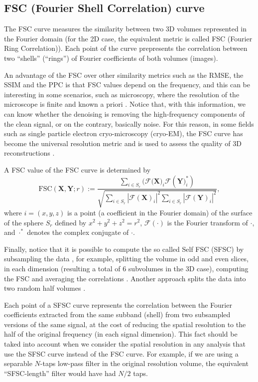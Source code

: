 \documentclass{article}
\begin{document}
\subsection{FSC (Fourier Shell Correlation) curve}
The FSC curve measures the similarity between two 3D volumes
represented in the Fourier domain \cite{verbeke2024self} (for the 2D
case, the equivalent metric is called FSC (Fourier Ring
Correlation)). Each point of the curve prepresents the correlation
between two ``shells'' (``rings'') of Fourier coefficients of both
volumes (images).

An advantage of the FSC over other similarity metrics such as the
RMSE, the SSIM and the PPC is that FSC values depend on the frequency,
and this can be interesting in some scenarios, such as microscopy,
where the resolution of the microscope is finite and known a priori
\cite{nieuwenhuizen2013measuring}. Notice that, with this information,
we can know whether the denoising is removing the high-frequency
components of the clean signal, or on the contrary, basically
noise. For this reason, in some fields such as single particle
electron cryo-microscopy (cryo-EM), the FSC curve has become the
universal resolution metric and is used to assess the quality of 3D
reconstructions \cite{rosenthal2003optimal,scheres2012prevention}.

A FSC value of the FSC curve is determined by~\cite{verbeke2024self}
\begin{equation}
\text{FSC}(\mathbf{X}, \mathbf{Y}; r) := \frac{\sum_{i \in S_r} (\mathcal{F}(\mathbf{X)}_i \mathcal{F}(\mathbf{Y)}_i^*)}{\sqrt{\sum_{i \in S_r} |\mathcal{F}(\mathbf{X})_i|^2 \sum_{i \in S_r} |\mathcal{F}(\mathbf{Y})_i|^2}},
\end{equation}
where $i=(x, y, z)$ is a point (a coefficient in the Fourier domain)
of the surface of the sphere $S_r$ defined by $x^2+y^2+z^2=r^2$,
$\mathcal{F}(\cdot)$ is the Fourier transform of $\cdot$, and
$\cdot^*$ denotes the complex conjugate of $\cdot$.


Finally, notice that it is possible to compute the so called Self FSC
(SFSC) by subsampling the data \cite{koho2019fourier}, for example,
splitting the volume in odd and even slices, in each dimension
(resulting a total of 6 subvolumes in the 3D case), computing the FSC
and averaging the correlations \cite{verbeke2024self}. Another
approach splits the data into two random half volumes
\cite{verbeke2024self}.

Each point of a SFSC curve represents the correlation between the
Fourier coefficients extracted from the same subband (shell) from two
subsampled versions of the same signal, at the cost of reducing the
spatial resolution to the half of the original frequency (in each
signal dimension). This fact should be taked into account when we
consider the spatial resolution in any analysis that use the SFSC
curve instead of the FSC curve. For example, if we are using a
separable $N$-taps low-pass filter in the original resolution volume,
the equivalent ``SFSC-length'' filter would have had $N/2$ taps.
\end{document}
